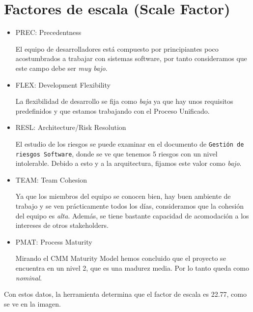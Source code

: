 \documentclass[spanish,a4paper,11pt, twoside]{report}	%
\begin{document}
\section{Factores de escala (Scale Factor)}
\begin {itemize}
	\item {PREC: Precedentness}

	El equipo de desarrolladores está compuesto por principiantes poco acostumbrados a trabajar con sistemas software, por tanto consideramos que este campo debe ser \textit{muy bajo}.
	\item {FLEX: Development Flexibility}

	La flexibilidad de desarrollo se fija como \textit{baja} ya que hay unos requisitos predefinidos y que estamos trabajando con  el Proceso Unificado.
	\item {RESL: Architecture/Risk Resolution}

	El estudio de los riesgos se puede examinar en el documento de \texttt{Gestión de riesgos Software}, donde se ve que tenemos 5 riesgos con un nivel intolerable. Debido a esto y a la arquitectura, fijamos este valor como \textit{bajo}.
	\item {TEAM: Team Cohesion}

	Ya que los miembros del equipo se conocen bien, hay buen ambiente de trabajo y se ven prácticamente todos los días, consideramos que la cohesión del equipo es \textit{alta}. Además, se tiene bastante capacidad de acomodación a los intereses de otros stakeholders.
	\item {PMAT: Process Maturity}

	Mirando el CMM Maturity Model hemos concluido que el proyecto se encuentra en un nivel 2, que es una madurez media. Por lo tanto queda como \textit{nominal}.
\end{itemize}

Con estos datos, la herramienta determina que el factor de escala es 22.77, como se ve en la imagen.

\vspace{0.4cm}
\hspace{3cm}
\vspace{0.35cm}
\end{document}
